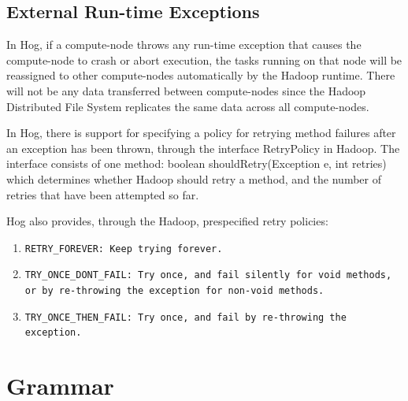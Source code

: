 \documentclass{article}
\begin{document}

\subsection{External Run-time Exceptions} %
\label{sub:external_run_time_exceptions}


In Hog, if a compute-node throws any run-time exception
that causes the compute-node to crash or abort execution,
the tasks running on that node will be reassigned to other
compute-nodes automatically by the Hadoop runtime. There
will not be any data transferred between compute-nodes since
the Hadoop Distributed File System replicates the same data
across all compute-nodes.

In Hog, there is support for specifying a policy for retrying
method failures after an exception has been thrown, through the
interface RetryPolicy in Hadoop. The interface consists of one 
method:
     boolean shouldRetry(Exception e, int retries)  
which determines whether Hadoop should retry a method, and the
number of retries that have been attempted so far.

Hog also provides, through the Hadoop, prespecified retry policies:

\begin{enumerate}
  \item \tt RETRY\_FOREVER\rm: Keep trying forever. 
  \item \tt TRY\_ONCE\_DONT\_FAIL\rm: Try once, and fail silently for void methods,
  or by re-throwing the exception for non-void methods.
  \item \tt TRY\_ONCE\_THEN\_FAIL\rm: Try once, and fail by re-throwing the exception.
\end{enumerate}



\section{Grammar} %
\label{sec:grammar}
\end{document}
